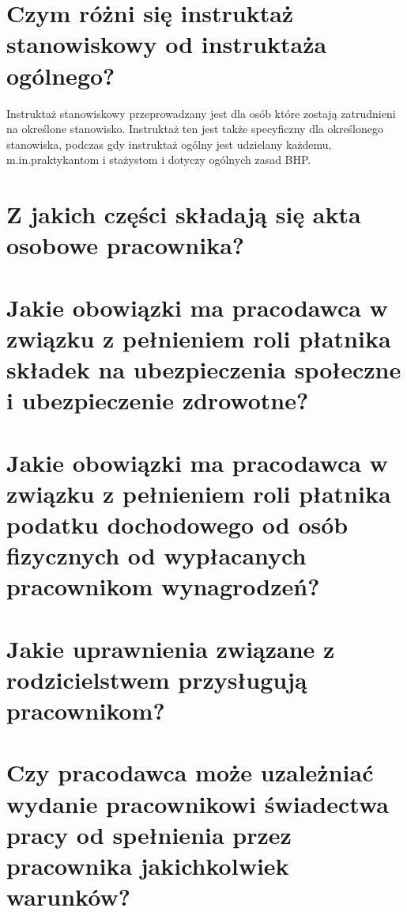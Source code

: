 \documentclass[a4paper]{article}
\begin{document}
\section{Czym różni się instruktaż stanowiskowy od instruktaża ogólnego?}

Instruktaż stanowiskowy przeprowadzany jest dla osób które zostają zatrudnieni na określone stanowisko. Instruktaż ten jest także specyficzny dla określonego stanowiska, podczas gdy instruktaż ogólny jest udzielany każdemu, m.in.\@ praktykantom i stażystom i dotyczy ogólnych zasad BHP.\@

\section{Z jakich części składają się akta osobowe pracownika?}
\section{Jakie obowiązki ma pracodawca w związku z pełnieniem roli płatnika składek na ubezpieczenia społeczne i ubezpieczenie zdrowotne?}
\section{Jakie obowiązki ma pracodawca w związku z pełnieniem roli płatnika podatku dochodowego od osób fizycznych od wypłacanych pracownikom wynagrodzeń?}
\section{Jakie uprawnienia związane z rodzicielstwem przysługują pracownikom?}
\section{Czy pracodawca może uzależniać wydanie pracownikowi świadectwa pracy od spełnienia przez pracownika jakichkolwiek warunków?}
\end{document}
